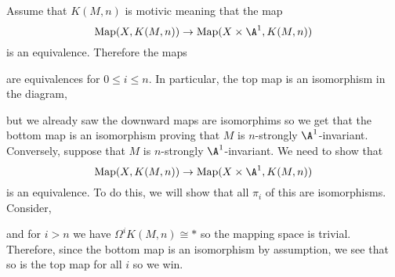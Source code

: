 \documentclass{article}
\begin{document}
Assume that $K(M,n)$ is motivic meaning that the map
\[ \Map(X, K(M,n)) \to \Map(X \times \A^1, K(M,n)) \]
is an equivalence. Therefore the maps
\begin{center}
\end{center} 
are equivalences for $0 \le i \le n$. In particular, the top map is an isomorphism in the diagram,
\begin{center}
\end{center}
but we already saw the downward maps are isomorphims so we get that the bottom map is an isomorphism proving that $M$ is $n$-strongly $\A^1$-invariant.
\bigskip\\
Conversely, suppose that $M$ is $n$-strongly $\A^1$-invariant. We need to show that
\[ \Map(X, K(M,n)) \to \Map(X \times \A^1, K(M,n)) \]
is an equivalence. To do this, we will show that all $\pi_i$ of this are isomorphisms. Consider,
\begin{center}
\end{center}
and for $i > n$ we have $\Omega^i K(M,n) \cong *$ so the mapping space is trivial. Therefore, since the bottom map is an isomorphism by assumption, we see that so is the top map for all $i$ so we win.
\end{document}
